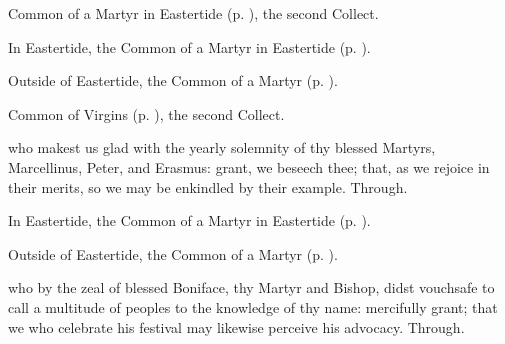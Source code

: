 \clearpage
{}

\begin{rubric}
	Common of a Martyr in Eastertide (p. \pageref{CommonMartyrBishopEasterCollect}), the second Collect.
\end{rubric}



\begin{rubric}
	In Eastertide, the Common of a Martyr in Eastertide (p. \pageref{CommonMartyrBishopEasterCollect}).
\end{rubric}

\begin{rubric}
	Outside of Eastertide, the Common of a Martyr (p. \pageref{CommonMartyrBishopCollect}).
\end{rubric}



\begin{rubric}
	Common of Virgins (p. \pageref{VirginOnlyCollect}), the second Collect.
\end{rubric}



\memorialCollect
{} who makest us glad with the yearly solemnity of thy blessed Martyrs, Marcellinus, Peter, and Erasmus: grant, we beseech thee; that, as we rejoice in their merits, so we may be enkindled by their example. Through.



\begin{rubric}
	In Eastertide, the Common of a Martyr in Eastertide (p. \pageref{CommonMartyrEaster}).
\end{rubric}

\begin{rubric}
	Outside of Eastertide, the Common of a Martyr (p. \pageref{CommonMartyr}).
\end{rubric}

{} who by the zeal of blessed Boniface, thy Martyr and Bishop, didst vouchsafe to call a multitude of peoples to the knowledge of thy name: mercifully grant; that we who celebrate his festival may likewise perceive his advocacy. Through.


